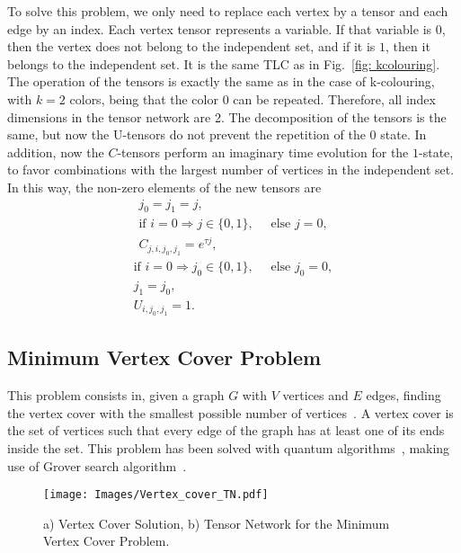 To solve this problem, we only need to replace each vertex by a tensor and each edge by an index. Each vertex tensor represents a variable. If that variable is $0$, then the vertex does not belong to the independent set, and if it is $1$, then it belongs to the independent set. It is the same TLC as in Fig.~\ref{fig: kcolouring}. The operation of the tensors is exactly the same as in the case of k-colouring, with $k=2$ colors, being that the color $0$ can be repeated. Therefore, all index dimensions in the tensor network are 2. The decomposition of the tensors is the same, but now the U-tensors do not prevent the repetition of the $0$ state. In addition, now the $C$-tensors perform an imaginary time evolution for the $1$-state, to favor combinations with the largest number of vertices in the independent set. In this way, the non-zero elements of the new tensors are
\begin{equation}
    \begin{gathered}
        j_0 = j_1 = j,\\
        \text{if } i=0\Rightarrow j\in\{0,1\},\quad \text{ else } j=0,\\
        C_{j,i, j_0,j_1} = e^{\tau j},
    \end{gathered}
\end{equation}
\begin{equation}
    \begin{gathered}
        \text{if } i=0\Rightarrow j_0\in\{0,1\},\quad \text{ else } j_0=0,\\
        j_1 = j_0,\\
        U_{i,j_0,j_1} = 1.
    \end{gathered}
\end{equation}


\subsection{Minimum Vertex Cover Problem}
This problem consists in, given a graph $G$ with $V$ vertices and $E$ edges, finding the vertex cover with the smallest possible number of vertices~\cite{Vertex_Cover}. A vertex cover is the set of vertices such that every edge of the graph has at least one of its ends inside the set. This problem has been solved with quantum algorithms~\cite{Vertex_Cover_Quantum}, making use of Grover search algorithm~\cite{Grover}.

\begin{figure}[h]
    \centering
    \texttt{[image: Images/Vertex\_cover\_TN.pdf]}
    \caption{a) Vertex Cover Solution, b) Tensor Network for the Minimum Vertex Cover Problem.}
    \label{fig: Vertex Cover}
\end{figure}

